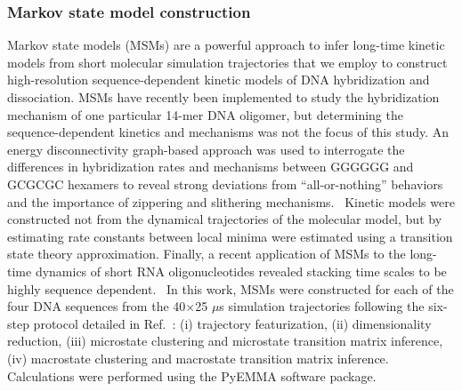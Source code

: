 \documentclass[journal=jpcbfk,manuscript=article]{achemso}
\begin{document}
\subsubsection{Markov state model construction}

Markov state models (MSMs) are a powerful approach to infer long-time kinetic models from short molecular simulation trajectories \citep{Sengupta2019AutomatedSelf-assembly} \citep{ Pande2010EverythingAsk, Chodera2014MarkovDynamics, Husic2018MarkovScience, Wehmeyer2019IntroductionV1.0} that we employ to construct high-resolution sequence-dependent kinetic models of DNA hybridization and dissociation. MSMs have recently been implemented to study the hybridization mechanism of one particular 14-mer DNA oligomer, but determining the sequence-dependent kinetics and mechanisms was not the focus of this study.\citep{Jin2019} An energy disconnectivity graph-based approach was used to interrogate the differences in hybridization rates and mechanisms between GGGGGG and GCGCGC hexamers to reveal strong deviations from ``all-or-nothing'' behaviors and the importance of zippering and slithering mechanisms.~\citep{Xiao2019} Kinetic models were constructed not from the dynamical trajectories of the molecular model, but by estimating rate constants between local minima were estimated using a transition state theory approximation. Finally, a recent application of MSMs to the long-time dynamics of short RNA oligonucleotides revealed stacking time scales to be highly sequence dependent.~\citep{Pinamonti2017} In this work, MSMs were constructed for each of the four DNA sequences from the 40$\times$25 $\mu$s simulation trajectories following the six-step protocol detailed in Ref.~\citep{Sidky}: (i) trajectory featurization, (ii) dimensionality reduction, (iii) microstate clustering and microstate transition matrix inference, (iv) macrostate clustering and macrostate transition matrix inference. Calculations were performed using the PyEMMA software package. \citep{Scherer2015PyEMMAModels}
\end{document}
